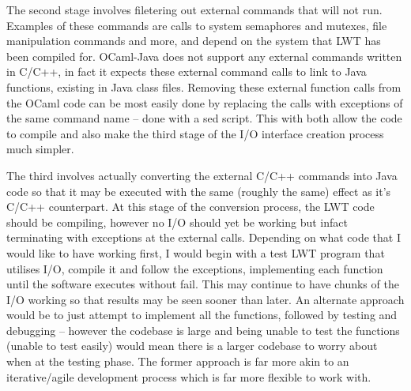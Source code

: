 \documentclass[12pt,twoside,notitlepage]{report}
\begin{document}
The second stage involves filetering out external commands that will not run. Examples of these commands are calls to system semaphores and mutexes, file manipulation commands and more, and depend on the system that LWT has been
compiled for. OCaml-Java does not support any external commands written in C/C++, in fact it expects these external command calls to link to Java functions, existing in Java class files. Removing these external function calls from the
OCaml code can be most easily done by replacing the calls with exceptions of the same command name -- done with a sed script. This with both allow the code to compile and also make the third stage of the I/O interface creation process
much simpler.

The third involves actually converting the external C/C++ commands into Java code so that it may be executed with the same (roughly the same) effect as it's C/C++ counterpart. At this stage of the conversion process, the LWT code
should be compiling, however no I/O should yet be working but infact terminating with exceptions at the external calls. Depending on what code that I would like to have working first, I would begin with a test LWT program that
utilises I/O, compile it and follow the exceptions, implementing each function until the software executes without fail. This may continue to have chunks of the I/O working so that results may be seen sooner than later. An alternate
approach would be to just attempt to implement all the functions, followed by testing and debugging -- however the codebase is large and being unable to test the functions (unable to test easily) would mean there is a larger codebase
to worry about when at the testing phase. The former approach is far more akin to an iterative/agile development process which is far more flexible to work with.
\end{document}

